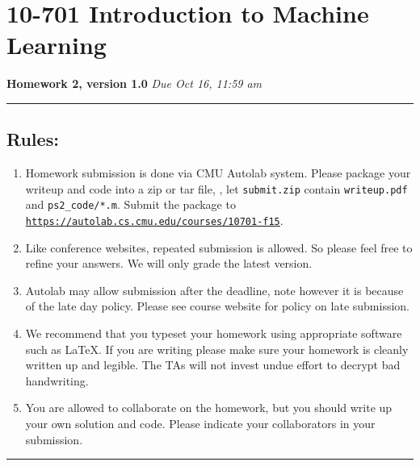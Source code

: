 \documentclass{article}
\begin{document}
\section*{10-701 Introduction to Machine Learning}
{\large \bf Homework 2, version 1.0} 
\hfill {\it Due Oct 16, 11:59 am}

\noindent\rule{\textwidth}{1pt}

\vspace{5ex}
\subsection*{Rules:}
\vspace{2ex}

\begin{enumerate}
\item Homework submission is done via CMU Autolab system. 
Please package your writeup and code into a zip or tar file, \eg, let {\tt submit.zip} contain {\tt writeup.pdf} and {\tt ps2\_code/*.m}.
Submit the package to  {\tt \href{https://autolab.cs.cmu.edu/courses/10701-f15}{https://autolab.cs.cmu.edu/courses/10701-f15}}. 


\item Like conference websites, repeated submission is allowed. 
So please feel free to refine your answers. 
We will only grade the latest version.

\item Autolab may allow submission after the deadline, note however it is because of the late day policy. Please see course website for policy on late submission. 

\item We recommend that you typeset your homework using appropriate software such as \LaTeX. If you are writing please make sure your homework is cleanly written up and legible. The TAs will not invest undue effort to decrypt bad handwriting.

\item You are allowed to collaborate on the homework, but you should write up your own solution and code. Please indicate your collaborators in your submission.

\end{enumerate}

\vspace{7ex}

\noindent\rule{\textwidth}{1pt}

\newpage










\end{document}
